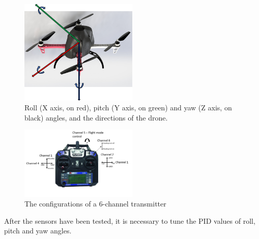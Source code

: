 \begin{figure} [ht]
    \centering
    \includegraphics[width=0.5\textwidth]{Figures/testing/imu_directions.png}
    \caption{Roll (X axis, on red), pitch (Y axis, on green) and yaw (Z axis, on black) angles, and the directions of the drone.}
    \label{fig:imu_angle}
\end{figure}

\begin{figure} [ht]
    \centering
    \includegraphics[width=0.5\textwidth]{Figures/testing/transmitter_controls.png}
    \caption{The configurations of a 6-channel transmitter}
    \label{fig:tranmitter_direction}
\end{figure}

After the sensors have been tested, it is necessary to tune the PID values of roll, pitch and yaw angles.



